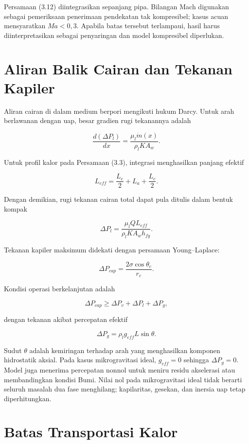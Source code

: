 \documentclass[
  12pt,
  12pt,a4paper,oneside]{report}
\begin{document}
Persamaan (3.12) diintegrasikan sepanjang pipa. Bilangan Mach digunakan
sebagai pemeriksaan penerimaan pendekatan tak kompresibel; kasus acuan
mensyaratkan \(Ma<0{,}3\). Apabila batas tersebut terlampaui, hasil
harus diinterpretasikan sebagai penyaringan dan model kompresibel
diperlukan.

\hypertarget{aliran-balik-cairan-dan-tekanan-kapiler}{%
\section{Aliran Balik Cairan dan Tekanan
Kapiler}\label{aliran-balik-cairan-dan-tekanan-kapiler}}

Aliran cairan di dalam medium berpori mengikuti hukum Darcy. Untuk arah
berlawanan dengan uap, besar gradien rugi tekanannya adalah

\[
\frac{d(\Delta P_l)}{dx}=\frac{\mu_l\dot m(x)}{\rho_l K A_w}.
\tag{3.13}\]

Untuk profil kalor pada Persamaan (3.3), integrasi menghasilkan panjang
efektif

\[
L_{eff}=\frac{L_e}{2}+L_a+\frac{L_c}{2}.
\tag{3.14}\]

Dengan demikian, rugi tekanan cairan total dapat pula ditulis dalam
bentuk kompak

\[
\Delta P_l=\frac{\mu_l Q L_{eff}}{\rho_l K A_w h_{fg}}.
\tag{3.15}\]

Tekanan kapiler maksimum didekati dengan persamaan Young--Laplace:

\[
\Delta P_{cap}=\frac{2\sigma\cos\theta_c}{r_c}.
\tag{3.16}\]

Kondisi operasi berkelanjutan adalah

\[
\Delta P_{cap}\geq \Delta P_v+\Delta P_l+\Delta P_g,
\tag{3.17}\]

dengan tekanan akibat percepatan efektif

\[
\Delta P_g=\rho_l g_{eff}L\sin\theta.
\tag{3.18}\]

Sudut \(\theta\) adalah kemiringan terhadap arah yang menghasilkan
komponen hidrostatik aksial. Pada kasus mikrogravitasi ideal,
\(g_{eff}=0\) sehingga \(\Delta P_g=0\). Model juga menerima percepatan
nonnol untuk meniru residu akselerasi atau membandingkan kondisi Bumi.
Nilai nol pada mikrogravitasi ideal tidak berarti seluruh masalah dua
fase menghilang; kapilaritas, gesekan, dan inersia uap tetap
diperhitungkan.

\hypertarget{batas-transportasi-kalor}{%
\section{Batas Transportasi Kalor}\label{batas-transportasi-kalor}}
\end{document}
